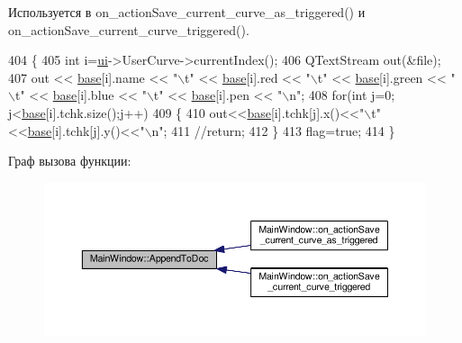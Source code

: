 Используется в on\+\_\+action\+Save\+\_\+current\+\_\+curve\+\_\+as\+\_\+triggered() и on\+\_\+action\+Save\+\_\+current\+\_\+curve\+\_\+triggered().


\begin{DoxyCode}
404 \{
405     \textcolor{keywordtype}{int} i=\hyperlink{class_main_window_a35466a70ed47252a0191168126a352a5}{ui}->UserCurve->currentIndex();
406     QTextStream out(&file);
407     out << \hyperlink{class_main_window_a3413d4508f4981518b1b8ebf3b29121e}{base}[i].name << \textcolor{stringliteral}{"\(\backslash\)t"} << \hyperlink{class_main_window_a3413d4508f4981518b1b8ebf3b29121e}{base}[i].red << \textcolor{stringliteral}{"\(\backslash\)t"} << \hyperlink{class_main_window_a3413d4508f4981518b1b8ebf3b29121e}{base}[i].green << \textcolor{stringliteral}{"\(\backslash\)t"} << 
      \hyperlink{class_main_window_a3413d4508f4981518b1b8ebf3b29121e}{base}[i].blue << \textcolor{stringliteral}{"\(\backslash\)t"} << \hyperlink{class_main_window_a3413d4508f4981518b1b8ebf3b29121e}{base}[i].pen << \textcolor{stringliteral}{"\(\backslash\)n"};
408     \textcolor{keywordflow}{for}(\textcolor{keywordtype}{int} j=0; j<\hyperlink{class_main_window_a3413d4508f4981518b1b8ebf3b29121e}{base}[i].tchk.size();j++)
409         \{
410             out<<\hyperlink{class_main_window_a3413d4508f4981518b1b8ebf3b29121e}{base}[i].tchk[j].x()<<\textcolor{stringliteral}{"\(\backslash\)t"}<<\hyperlink{class_main_window_a3413d4508f4981518b1b8ebf3b29121e}{base}[i].tchk[j].y()<<\textcolor{stringliteral}{"\(\backslash\)n"};
411             \textcolor{comment}{//return;}
412         \}
413     flag=\textcolor{keyword}{true};
414 \}
\end{DoxyCode}


Граф вызова функции\+:\nopagebreak
\begin{figure}[H]
\begin{center}
\leavevmode
\includegraphics[width=350pt]{class_main_window_ab31b6edb24cdb7744f4ab4db3300b29c_icgraph}
\end{center}
\end{figure}


